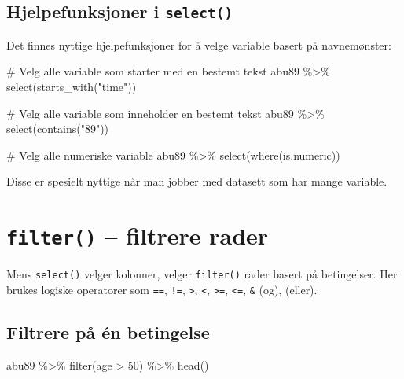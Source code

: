 \documentclass[
  norsk,
  letterpaper,
  DIV=11,
  numbers=noendperiod]{scrreprt}
\newenvironment{Shaded}{\begin{snugshade}}{\end{snugshade}}
\newcommand{\CommentTok}[1]{\textcolor[rgb]{0.37,0.37,0.37}{#1}}
\newcommand{\DecValTok}[1]{\textcolor[rgb]{0.68,0.00,0.00}{#1}}
\newcommand{\FunctionTok}[1]{\textcolor[rgb]{0.28,0.35,0.67}{#1}}
\newcommand{\NormalTok}[1]{\textcolor[rgb]{0.00,0.23,0.31}{#1}}
\newcommand{\SpecialCharTok}[1]{\textcolor[rgb]{0.37,0.37,0.37}{#1}}
\newcommand{\StringTok}[1]{\textcolor[rgb]{0.13,0.47,0.30}{#1}}
\theoremstyle{definition}
\theoremstyle{remark}
\begin{document}
\subsection{\texorpdfstring{Hjelpefunksjoner i
\texttt{select()}}{Hjelpefunksjoner i select()}}\label{hjelpefunksjoner-i-select}

Det finnes nyttige hjelpefunksjoner for å velge variable basert på
navnemønster:

\begin{Shaded}
\begin{Highlighting}[]
\CommentTok{\# Velg alle variable som starter med en bestemt tekst}
\NormalTok{abu89 }\SpecialCharTok{\%\textgreater{}\%} \FunctionTok{select}\NormalTok{(}\FunctionTok{starts\_with}\NormalTok{(}\StringTok{"time"}\NormalTok{))}

\CommentTok{\# Velg alle variable som inneholder en bestemt tekst}
\NormalTok{abu89 }\SpecialCharTok{\%\textgreater{}\%} \FunctionTok{select}\NormalTok{(}\FunctionTok{contains}\NormalTok{(}\StringTok{"89"}\NormalTok{))}

\CommentTok{\# Velg alle numeriske variable}
\NormalTok{abu89 }\SpecialCharTok{\%\textgreater{}\%} \FunctionTok{select}\NormalTok{(}\FunctionTok{where}\NormalTok{(is.numeric))}
\end{Highlighting}
\end{Shaded}

Disse er spesielt nyttige når man jobber med datasett som har mange
variable.

\section{\texorpdfstring{\texttt{filter()} -- filtrere
rader}{filter() -- filtrere rader}}\label{filter-filtrere-rader}

Mens \texttt{select()} velger kolonner, velger \texttt{filter()} rader
basert på betingelser. Her brukes logiske operatorer som \texttt{==},
\texttt{!=}, \texttt{\textgreater{}}, \texttt{\textless{}},
\texttt{\textgreater{}=}, \texttt{\textless{}=}, \texttt{\&} (og),
\texttt{\textbar{}} (eller).

\subsection{Filtrere på én
betingelse}\label{filtrere-puxe5-uxe9n-betingelse}

\begin{Shaded}
\begin{Highlighting}[]
\NormalTok{abu89 }\SpecialCharTok{\%\textgreater{}\%}
  \FunctionTok{filter}\NormalTok{(age }\SpecialCharTok{\textgreater{}} \DecValTok{50}\NormalTok{) }\SpecialCharTok{\%\textgreater{}\%}
  \FunctionTok{head}\NormalTok{()}
\end{Highlighting}
\end{Shaded}
\end{document}
